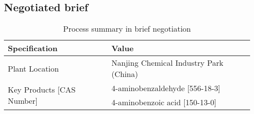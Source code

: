 \begin{landscape}
\section{Negotiated brief}
\label{app:brief}

\begin{table}[h]
\centering\small
\caption{Process summary in brief negotiation}
\label{tab:brief}
\begin{tabular}{@{}lll@{}}
\toprule
\multicolumn{2}{l}{\textbf{Specification}}                              & \textbf{Value}                                                                                                                                                                                                                                                                                                                                                                                                        \\ \midrule
\multicolumn{2}{l}{Plant Location}                                       & Nanjing Chemical Industry Park (China)                                                                                                                                                                                                                                                                                                                                                                                \\ \midrule
\multicolumn{2}{l}{\multirow{3}{*}{Key Products {[}CAS Number{]}}}       & 4-aminobenzaldehyde {[}556-18-3{]}                                                                                                                                                                                                                                                                                                                                                                                    \\ \cmidrule(l){3-3} 
\multicolumn{2}{l}{}                                                     & 4-aminobenzoic acid {[}150-13-0{]}                                                                                                                                                                                                                                                                                                                                                                                    \\ \cmidrule(l){3-3} 

\end{tabular}
\end{table}
\end{landscape}
